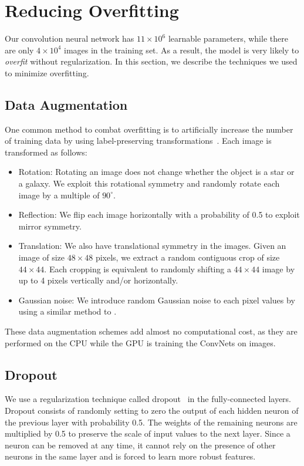 \documentclass[fleqn,usenatbib]{mnras}
\begin{document}
\section{Reducing Overfitting}
  \label{sec:overfitting}
  
Our convolution neural network has $11\times10^6$ learnable parameters,
while there are only $4\times10^4$ images in the training set.
As a result, the model is very likely to \emph{overfit} without regularization.
In this section, we describe the techniques we used to minimize overfitting.

\subsection{Data Augmentation}
  \label{sec:data_augmentation}
  
One common method to combat overfitting is to artificially increase
the number of training data by using label-preserving
transformations~\citep{krizhevsky2012imagenet,dieleman2015rotation,dieleman2016exploiting}.
Each image is transformed as follows:
\begin{itemize}
\item{Rotation: 
Rotating an image does not change whether the object is a star or a galaxy.
We exploit this rotational symmetry and randomly rotate each image by a multiple of
$90^{\circ}$. }

\item{Reflection:
We flip each image horizontally with a probability of 0.5 to exploit mirror symmetry. }
\item{Translation:
We also have translational symmetry in the images.
Given an image of size $48\times48$ pixels, we extract a random contiguous crop
of size $44\times44$.
Each cropping is equivalent to randomly shifting a $44\times44$ image by up to 4 pixels
vertically and/or horizontally. }
\item{Gaussian noise:
We introduce random Gaussian noise to each pixel values
by using a similar method to \cite{krizhevsky2012imagenet}. }
\end{itemize}
These data augmentation schemes add almost no computational cost,
as they are performed on the CPU while the GPU is training the ConvNets on images.

\subsection{Dropout}

We use a regularization technique called dropout~\citep{hinton2012improving}
in the fully-connected layers.
Dropout consists of randomly setting to zero
the output of each hidden neuron of the previous layer with probability 0.5.
The weights of the remaining neurons are multiplied by 0.5 to preserve
the scale of input values to the next layer.
Since a neuron can be removed at any time, it cannot rely on the presence of other neurons
in the same layer and is forced to learn more robust features.
\end{document}

